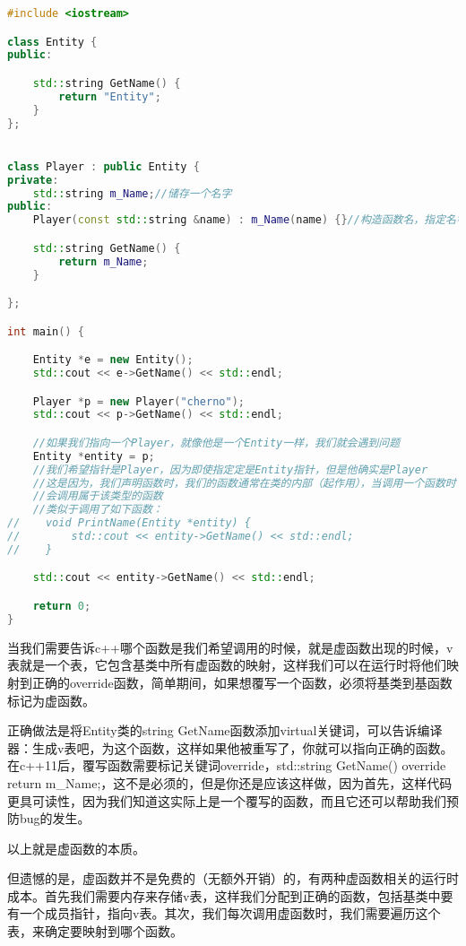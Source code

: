\begin{lstlisting}[language=c++]
#include <iostream>

class Entity {
public:

    std::string GetName() {
        return "Entity";
    }
};


class Player : public Entity {
private:
    std::string m_Name;//储存一个名字
public:
    Player(const std::string &name) : m_Name(name) {}//构造函数名，指定名字

    std::string GetName() {
        return m_Name;
    }

};

int main() {

    Entity *e = new Entity();
    std::cout << e->GetName() << std::endl;

    Player *p = new Player("cherno");
    std::cout << p->GetName() << std::endl;

    //如果我们指向一个Player，就像他是一个Entity一样，我们就会遇到问题
    Entity *entity = p;
    //我们希望指针是Player，因为即使指定定是Entity指针，但是他确实是Player
    //这是因为，我们声明函数时，我们的函数通常在类的内部（起作用），当调用一个函数时
    //会调用属于该类型的函数
    //类似于调用了如下函数：
//    void PrintName(Entity *entity) {
//        std::cout << entity->GetName() << std::endl;
//    }

    std::cout << entity->GetName() << std::endl;

    return 0;
}
\end{lstlisting}

当我们需要告诉c++哪个函数是我们希望调用的时候，就是虚函数出现的时候，v表就是一个表，它包含基类中所有虚函数的映射，这样我们可以在运行时将他们映射到正确的override函数，简单期间，如果想覆写一个函数，必须将基类到基函数标记为虚函数。

正确做法是将{\ncodestyle Entity}类的{\ncodestyle string GetName}函数添加{\ncodestyle virtual}关键词，可以告诉编译器：生成v表吧，为这个函数，这样如果他被重写了，你就可以指向正确的函数。在c++11后，覆写函数需要标记关键词{\ncodestyle override}，{\ncodestyle std::string GetName() override {return m_Name;}}，这不是必须的，但是你还是应该这样做，因为首先，这样代码更具可读性，因为我们知道这实际上是一个覆写的函数，而且它还可以帮助我们预防bug的发生。

以上就是虚函数的本质。

但遗憾的是，虚函数并不是免费的（无额外开销）的，有两种虚函数相关的运行时成本。首先我们需要内存来存储v表，这样我们分配到正确的函数，包括基类中要有一个成员指针，指向v表。其次，我们每次调用虚函数时，我们需要遍历这个表，来确定要映射到哪个函数。

